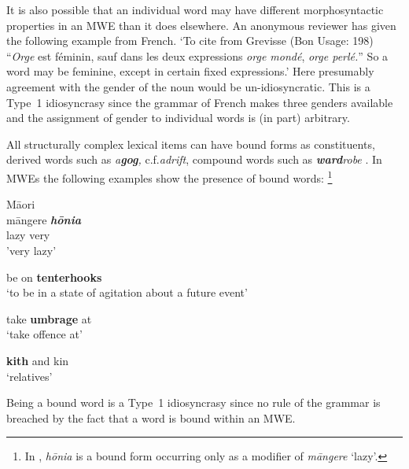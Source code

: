 \documentclass[output=paper]{langsci/langscibook}
\begin{document}
It is also possible that an individual word may have different  morphosyntactic properties in an MWE than it does elsewhere.  An anonymous reviewer has given the following example from French. ‘To cite from Grevisse (Bon Usage: 198) “\textit{Orge} est féminin, sauf dans les deux expressions \textit{orge mondé}, \textit{orge perlé.}” So a word may be feminine, except in certain fixed expressions.’ Here presumably agreement with the gender of the noun would be un-idiosyncratic. This is a Type~1 idiosyncrasy since the grammar of French  makes three genders available and the assignment of gender to individual words is (in part) arbitrary.

All structurally complex lexical items can have bound forms as constituents, derived words such as \textit{a}\textbf{\textit{gog}}\textit{,} c.f.\@ \textit{adrift}, compound words such as \textbf{\textit{ward}}\textit{robe} \citep{Richter2010}. In MWEs the following examples show the presence of bound words:%
\footnote{In , \textit{h\=onia} is a bound form occurring only as a modifier of \textit{m\=angere} ‘lazy’.}  

\begin{exe}
\ex\label{ex:ex18}    M\=aori\\ 
\gll m\=angere \textbf{\textit{h\=onia}} \\
                      lazy     very\\
                      \glt 'very lazy'



\ex\label{ex:ex19}  be on \textbf{tenterhooks}\\
  ‘to be in a state of agitation about a future event’


\ex\label{ex:ex20}   take \textbf{umbrage} at\\
 ‘take offence at’

\ex\label{ex:ex21}    \textbf{kith} and kin\\
  ‘relatives’
\end{exe}



Being a bound word is a Type~1 idiosyncrasy since no rule of the grammar is breached by the fact that a word is bound within an MWE.
\end{document}
